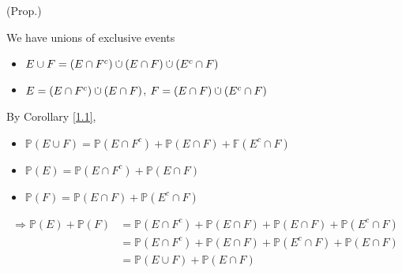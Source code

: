 \documentclass[a4paper,11pt]{amsbook}
\makeatletter
\renewenvironment{proof}[1][\proofname]{\par
    \pushQED{\qed}%
    \normalfont \topsep6\p@\@plus6\p@\relax
    \trivlist
    \itemindent\z@ %
    \item[\hskip\labelsep
          \scshape
      #1\@addpunct{.}]\ignorespaces
}{%
    \popQED\endtrivlist\@endpefalse
}
\theoremstyle{definition}
\theoremstyle{remark}
\newcommand{\F}{\mathbb{F}}
\renewcommand{\P}{\mathbb{P}}
\newcommand\0{\varnothing}
\newcommand\Disj
{
    \setbox0\hbox{$\cup$}
    \rlap{\hbox to \wd0{\hss\raisebox{3.5pt}{$\cdot$}\hss}}\box0
}
\newcommand\disj
{
    \mathbin{\mathchoice{\Disj}{\Disj}{\scalebox{0.5}{$\Disj$}}{\scalebox{0.4}{$\Disj$}}}
}
\makeatother
\begin{document}
    \begin{proof} (Prop.)
        \begin{center}
        \end{center}

        We have unions of exclusive events
        \begin{itemize}
            \item $E\cup F=(E\cap F^c)\disj(E\cap F)\disj(E^c\cap F)$
            \item $E=(E\cap F^c)\disj(E\cap F)$, $F=(E\cap F)\disj(E^c\cap F)$
        \end{itemize}

        By Corollary \ref{1.1}, \begin{itemize}
            \item $\P(E\cup F)=\P(E\cap F^c)+\P(E\cap F)+\F(E^c\cap F)$
            \item $\P(E)=\P(E\cap F^c)+\P(E\cap F)$
            \item $\P(F)=\P(E\cap F)+\P(E^c\cap F)$
        \end{itemize}
        \begin{align*}
            \Rightarrow\P(E)+\P(F)&=\P(E\cap F^c)+\P(E\cap F)+\P(E\cap F)+\P(E^c\cap F)\\
            &=\P(E\cap F^c)+\P(E\cap F)+\P(E^c\cap F)+\P(E\cap F) \\
            &=\P(E\cup F)+\P(E\cap F)
        \end{align*}
    \end{proof}
\end{document}

